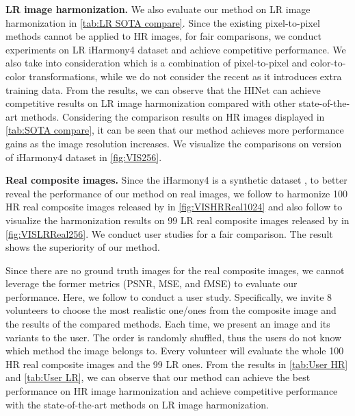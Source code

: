\documentclass[10pt,journal,twocolumn,twoside]{IEEEtran}
\begin{document}
\textbf{LR image harmonization.} We also evaluate our method on LR image harmonization in \cref{tab:LR SOTA compare}. Since the existing pixel-to-pixel methods \cite{tsai2017deep, cun2020improving, cong2020dovenet, cong2021bargainnet, ling2021region, guo2021intrinsic, guo2021image, sofiiuk2021foreground} cannot be applied to HR images, for fair comparisons, we conduct experiments on  LR iHarmony4 dataset and achieve competitive performance. We also take \cite{cong2022high} into consideration which is a combination of pixel-to-pixel and color-to-color transformations, while we do not consider the recent \cite{hang2022scs} as it introduces extra training data. From the results, we can observe that the HINet can achieve competitive results on LR image harmonization compared with other state-of-the-art methods. Considering the comparison results on HR images displayed in \cref{tab:SOTA compare}, it can be seen that our method achieves more performance gains as the image resolution increases. We visualize the comparisons on  version of iHarmony4 dataset in \cref{fig:VIS256}. 


\textbf{Real composite images.} Since the iHarmony4 is a synthetic dataset \cite{cong2020dovenet}, to better reveal the performance of our method on real images, we follow \cite{cong2022high} to harmonize 100 HR real composite images released by \cite{cong2022high} in \cref{fig:VISHRReal1024} and also follow \cite{guo2021intrinsic, hang2022scs, ling2021region} to visualize the harmonization results on 99 LR real composite images released by \cite{tsai2017deep} in \cref{fig:VISLRReal256}. We conduct user studies for a fair comparison. The result shows the superiority of our method.

Since there are no ground truth images for the real composite images, we cannot leverage the former metrics (PSNR, MSE, and fMSE) to evaluate our performance. Here, we follow \cite{ling2021region} to conduct a user study. Specifically, we invite 8 volunteers to choose the most realistic one/ones from the composite image and the results of the compared methods. Each time, we present an image and its variants to the user. The order is randomly shuffled, thus the users do not know which method the image belongs to. Every volunteer will evaluate the whole 100 HR real composite images and the 99 LR ones. From the results in \cref{tab:User HR} and \cref{tab:User LR}, we can observe that our method can achieve the best performance on HR image harmonization and achieve competitive performance with the state-of-the-art methods on LR image harmonization.
\end{document}

